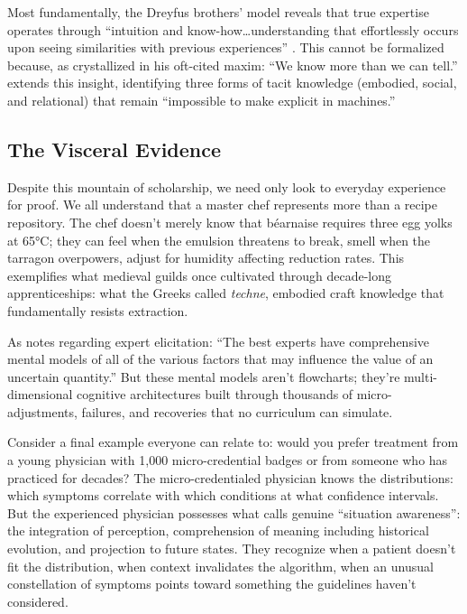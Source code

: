 Most fundamentally, the Dreyfus brothers' model reveals that true expertise operates through ``intuition and know-how\ldots understanding that effortlessly occurs upon seeing similarities with previous experiences'' \citep{pena2010}. This cannot be formalized because, as \citet{polanyi1966} crystallized in his oft-cited maxim: ``We know more than we can tell.'' \citet{collins2010} extends this insight, identifying three forms of tacit knowledge (embodied, social, and relational) that remain ``impossible to make explicit in machines.''

\subsection{The Visceral Evidence}

Despite this mountain of scholarship, we need only look to everyday experience for proof. We all understand that a master chef represents more than a recipe repository. The chef doesn't merely know that béarnaise requires three egg yolks at 65°C; they can feel when the emulsion threatens to break, smell when the tarragon overpowers, adjust for humidity affecting reduction rates. This exemplifies what medieval guilds once cultivated through decade-long apprenticeships: what the Greeks called \emph{techne}, embodied craft knowledge that fundamentally resists extraction.

As \citet{morgan2014} notes regarding expert elicitation: ``The best experts have comprehensive mental models of all of the various factors that may influence the value of an uncertain quantity.'' But these mental models aren't flowcharts; they're multi-dimensional cognitive architectures built through thousands of micro-adjustments, failures, and recoveries that no curriculum can simulate.

Consider a final example everyone can relate to: would you prefer treatment from a young physician with 1,000 micro-credential badges or from someone who has practiced for decades? The micro-credentialed physician knows the distributions: which symptoms correlate with which conditions at what confidence intervals. But the experienced physician possesses what \citet{endsley1995} calls genuine ``situation awareness'': the integration of perception, comprehension of meaning including historical evolution, and projection to future states. They recognize when a patient doesn't fit the distribution, when context invalidates the algorithm, when an unusual constellation of symptoms points toward something the guidelines haven't considered.

